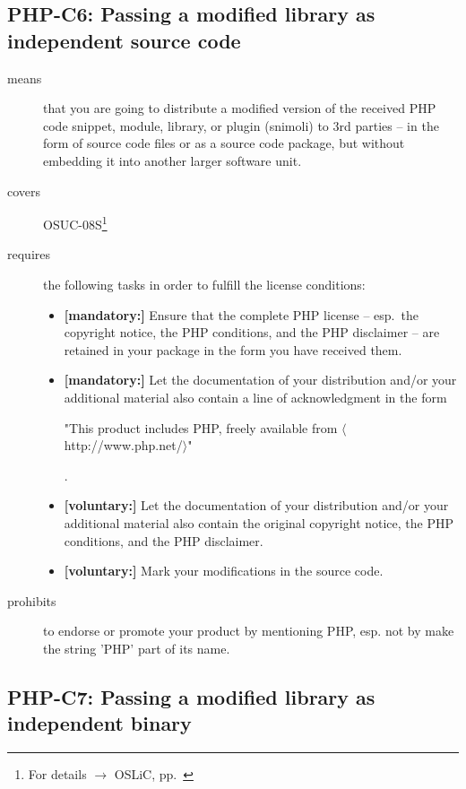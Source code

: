 \subsection{PHP-C6: Passing a modified library as independent source code}
\label{OSUC-08S-PHP}
\begin{description}
\item[means] that you are going to distribute a modified version of the received
PHP code snippet, module, library, or plugin (snimoli) to 3rd parties -- in the
form of source code files or as a source code package, but without embedding it
into another larger software unit.
\item[covers] OSUC-08S\footnote{For details $\rightarrow$ OSLiC, pp.\
\pageref{OSUC-08S-DEF}}
\item[requires] the following tasks in order to fulfill the license conditions:
\begin{itemize}
  
  \item \textbf{[mandatory:]} Ensure that the complete PHP license -- esp.\
  the copyright notice, the PHP conditions, and the PHP disclaimer -- are
  retained in your package in the form you have received them.
  
  \item \textbf{[mandatory:]} Let the documentation of your distribution and/or
  your additional material also contain a line of acknowledgment in the form
  \begin{footnotesize}"This product includes PHP, freely available from
  $\langle$http://www.php.net/$\rangle$"\end{footnotesize}.
    
  \item \textbf{[voluntary:]} Let the documentation of your distribution and/or
  your additional material also contain the original copyright notice, the PHP
  conditions, and the PHP disclaimer.
     
  \item \textbf{[voluntary:]} Mark your modifications in the source code.
  
\end{itemize}

\item[prohibits] to endorse or promote your product by mentioning PHP, esp. not
by make the string 'PHP' part of its name.

\end{description}


\subsection{PHP-C7: Passing a modified library as independent binary}
\label{OSUC-08B-PHP}

